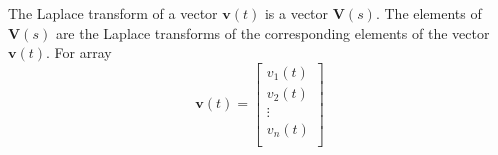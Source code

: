 The Laplace transform of a vector $\mathbf{v}(t)$ is a vector
$\mathbf{V}(s)$. The elements of $\mathbf{V}(s)$ are the Laplace
transforms of the corresponding elements of the vector
$\mathbf{v}(t)$.
For array
\begin{displaymath}
  \mathbf{v}(t) = \left[
  \begin{array}{c}
    v_1(t) \\
    v_2(t) \\
    \vdots \\
    v_n(t) \\
  \end{array}
  \right]
\end{displaymath}


\endinput

